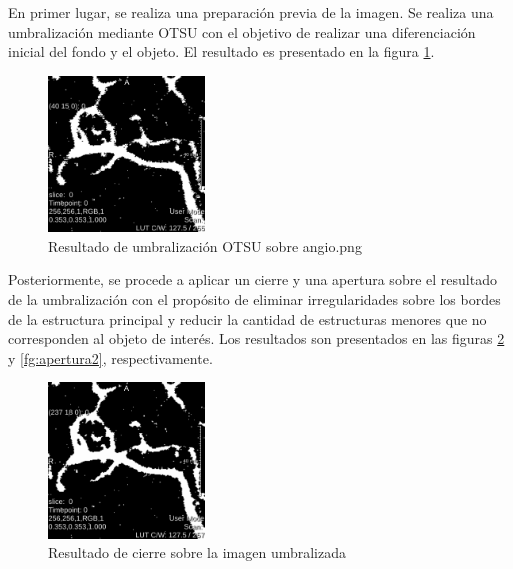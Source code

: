 \documentclass{article}
\begin{document}
En primer lugar, se realiza una preparaci\'{o}n previa de la imagen. Se realiza una umbralizaci\'{o}n mediante OTSU con el objetivo de realizar una diferenciaci\'{o}n inicial del fondo y el objeto. El resultado es presentado en la figura \ref{fg:otsu2}.

\begin{figure}[ht]
\begin{center}
\includegraphics[width=0.37\textwidth]{3Esqueleto/3_otsu2} %
\caption{Resultado de umbralizaci\'{o}n OTSU sobre angio.png}
\label{fg:otsu2}
\end{center}
\end{figure}
\FloatBarrier

Posteriormente, se procede a aplicar un cierre y una apertura sobre el resultado de la umbralizaci\'{o}n con el prop\'{o}sito de eliminar irregularidades sobre los bordes de la estructura principal y reducir la cantidad de estructuras menores que no corresponden al objeto de inter\'{e}s. Los resultados son presentados en las figuras \ref{fg:cierre2} y \ref{fg:apertura2}, respectivamente.

\begin{figure}[ht]
\begin{center}
\includegraphics[width=0.37\textwidth]{3Esqueleto/3_cierre2} %
\caption{Resultado de cierre sobre la imagen umbralizada}
\label{fg:cierre2}
\end{center}
\end{figure}
\FloatBarrier
\end{document}

